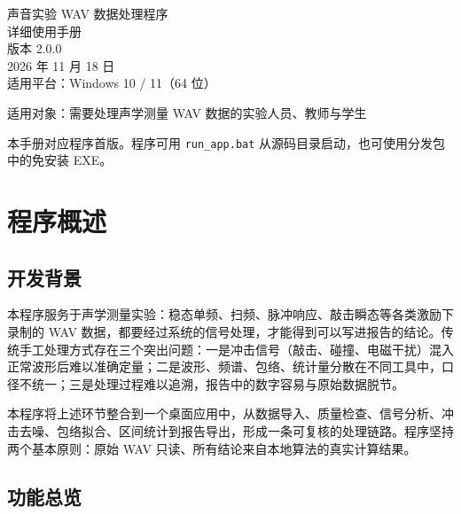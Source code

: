 \documentclass[UTF8,a4paper,12pt,scheme=chinese]{ctexart}
\begin{document}
\begin{titlepage}
\centering
\vspace*{2.5cm}
{\heiti 声音实验 WAV 数据处理程序}\\[0.8cm]
{\heiti 详细使用手册}\\[1.2cm]
{\large 版本 2.0.0}\\[0.3cm]
{\large 2026 年 11 月 18 日}\\[0.6cm]
{\large 适用平台：Windows 10 / 11（64 位）}\\[2.0cm]

\begin{minipage}{0.78\textwidth}
\centering
\large
适用对象：需要处理声学测量 WAV 数据的实验人员、教师与学生
\end{minipage}

\vfill
{\small 本手册对应程序首版。程序可用 \texttt{run\_app.bat} 从源码目录启动，也可使用分发包中的免安装 EXE。}
\end{titlepage}

\newpage

\tableofcontents
\newpage

\section{程序概述}

\subsection{开发背景}

本程序服务于声学测量实验：稳态单频、扫频、脉冲响应、敲击瞬态等各类激励下录制的 WAV 数据，都要经过系统的信号处理，才能得到可以写进报告的结论。传统手工处理方式存在三个突出问题：一是冲击信号（敲击、碰撞、电磁干扰）混入正常波形后难以准确定量；二是波形、频谱、包络、统计量分散在不同工具中，口径不统一；三是处理过程难以追溯，报告中的数字容易与原始数据脱节。

本程序将上述环节整合到一个桌面应用中，从数据导入、质量检查、信号分析、冲击去噪、包络拟合、区间统计到报告导出，形成一条可复核的处理链路。程序坚持两个基本原则：原始 WAV 只读、所有结论来自本地算法的真实计算结果。

\subsection{功能总览}
\end{document}
